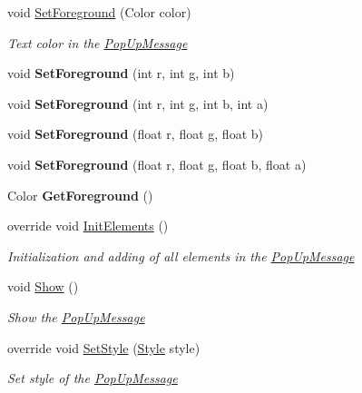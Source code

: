 \begin{DoxyCompactItemize}
void \mbox{\hyperlink{class_space_v_i_l_1_1_pop_up_message_ae46f44949f484301b57b2ee6cb367ee9}{Set\+Foreground}} (Color color)
\begin{DoxyCompactList}\small\item\em Text color in the \mbox{\hyperlink{class_space_v_i_l_1_1_pop_up_message}{Pop\+Up\+Message}} \end{DoxyCompactList}\item 
\mbox{\label{class_space_v_i_l_1_1_pop_up_message_af2a00344c44105b2d113c84955682c0c}} 
void {\bfseries Set\+Foreground} (int r, int g, int b)
\item 
\mbox{\label{class_space_v_i_l_1_1_pop_up_message_aff095ddb6c50188e68ab59dc14e39ba4}} 
void {\bfseries Set\+Foreground} (int r, int g, int b, int a)
\item 
\mbox{\label{class_space_v_i_l_1_1_pop_up_message_ae09a19a3c2d798abcd14b6b8aef8d505}} 
void {\bfseries Set\+Foreground} (float r, float g, float b)
\item 
\mbox{\label{class_space_v_i_l_1_1_pop_up_message_ad3b65677421d443abb2c1e93d25bbaef}} 
void {\bfseries Set\+Foreground} (float r, float g, float b, float a)
\item 
\mbox{\label{class_space_v_i_l_1_1_pop_up_message_aac84ef35ee85dadc98de2ac08ead1156}} 
Color {\bfseries Get\+Foreground} ()
\item 
override void \mbox{\hyperlink{class_space_v_i_l_1_1_pop_up_message_a34573fddbd8492ec1261c65f59dd3bbb}{Init\+Elements}} ()
\begin{DoxyCompactList}\small\item\em Initialization and adding of all elements in the \mbox{\hyperlink{class_space_v_i_l_1_1_pop_up_message}{Pop\+Up\+Message}} \end{DoxyCompactList}\item 
void \mbox{\hyperlink{class_space_v_i_l_1_1_pop_up_message_acd66fca578bf2547f983d48650b0f618}{Show}} ()
\begin{DoxyCompactList}\small\item\em Show the \mbox{\hyperlink{class_space_v_i_l_1_1_pop_up_message}{Pop\+Up\+Message}} \end{DoxyCompactList}\item 
override void \mbox{\hyperlink{class_space_v_i_l_1_1_pop_up_message_adeaf6b8c53f63d24c8342182ac699708}{Set\+Style}} (\mbox{\hyperlink{class_space_v_i_l_1_1_decorations_1_1_style}{Style}} style)
\begin{DoxyCompactList}\small\item\em Set style of the \mbox{\hyperlink{class_space_v_i_l_1_1_pop_up_message}{Pop\+Up\+Message}} \end{DoxyCompactList}\end{DoxyCompactItemize}
